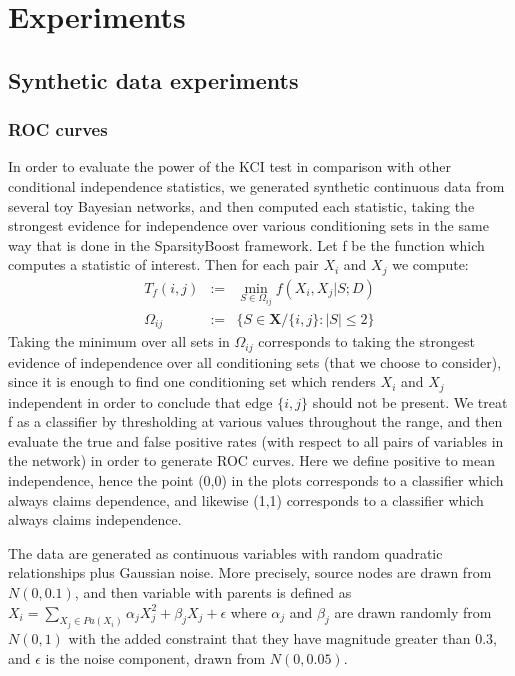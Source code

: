 \documentclass{article} %
\begin{document}
\section{Experiments}


\subsection{Synthetic data experiments}

\subsubsection{ROC curves}
In order to evaluate the power of the KCI test in comparison with other conditional independence statistics, we generated synthetic continuous data from several toy Bayesian networks, and then computed each statistic, taking the strongest evidence for independence over various conditioning sets in the same way that is done in the SparsityBoost framework.  Let f be the function which computes a statistic of interest. Then for each pair $X_i$ and $X_j$ we compute:  \begin{eqnarray*} T_f(i,j) &:=& \min_{S \in \Omega_{ij} } f(X_i,X_j | S; D) \\ \Omega_{ij} &:=& \{ S \in \mathbf{X} / \{i,j\} : |S| \leq 2 \} \end{eqnarray*}  Taking the minimum over all sets in $\Omega_{ij}$ corresponds to taking the strongest evidence of independence over all conditioning sets (that we choose to consider), since it is enough to find one conditioning set which renders $X_i$ and $X_j$ independent in order to conclude that edge $\{i,j\}$ should not be present.  We treat f as a classifier by thresholding at various values throughout the range, and then evaluate the true and false positive rates (with respect to all pairs of variables in the network) in order to generate ROC curves.  Here we define positive to mean independence, hence the point (0,0) in the plots corresponds to a classifier which always claims dependence, and likewise (1,1) corresponds to a classifier which always claims independence.

The data are generated as continuous variables with random quadratic relationships plus Gaussian noise.  More precisely, source nodes are drawn from $N(0, 0.1)$, and then variable with parents is defined as $X_i = \sum_{X_j \in Pa(X_i)} \alpha_j X_j^2 + \beta_j X_j + \epsilon $ where $\alpha_j$ and $\beta_j$ are drawn randomly from $N(0, 1)$ with the added constraint that they have magnitude greater than 0.3, and $\epsilon$ is the noise component, drawn from $N(0, 0.05)$.  
\end{document}
